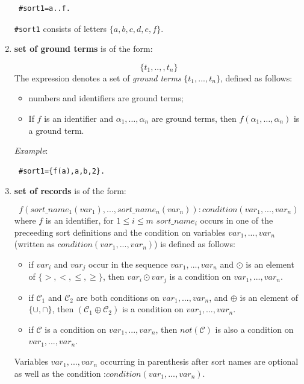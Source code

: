 \documentclass[12pt, letterpaper]{article}
\begin{document}
\begin{enumerate}
\begin{verbatim}
 #sort1=a..f.
\end{verbatim}

\texttt{\#sort1} consists of letters $\{a,b,c,d,e,f\}$.

\item \textbf{set of ground terms} is of the form:

\begin{equation*}
\{t_1,..,,t_n\}
\end{equation*}
The expression denotes a set of \textit{ground terms} $\{t_1,...,t_n\}$, defined as follows:
\begin{itemize}
 \item numbers and identifiers are ground terms;
 \item If $f$ is an identifier and $\alpha_1, \dots, \alpha_n$ are ground terms, 
then $f(\alpha_1,\dots, \alpha_n)$ is a ground term.
\end{itemize}

\textit{Example}: 
\begin{verbatim}
 #sort1={f(a),a,b,2}.
\end{verbatim}
\item \textbf{set of records} is of the form:

\begin{equation*}
f(sort\_name_1(var_1),..., sort\_name_n(var_n)):
                                     condition(var_1,...,var_n)
\end{equation*}
where $f$ is an identifier, for $ 1\leq i\leq m$ $sort\_name_i$ occurs in one of the preceeding sort definitions and  the condition on variables $var_1,...,var_n$ (written as $condition(var_1,...,var_n)$) is defined as follows:

\begin{itemize}
\item if $var_i$ and $var_j$ occur in the sequence  $var_1,...,var_n$ and $\odot$ is an element of $\{>,<,\le,\ge\}$, then $var_i \odot var_j$ is a condition on   $var_1,...,var_n$.
\item if $\mathcal{C}_1$ and $\mathcal{C}_2$ are both conditions on  $var_1,...,var_n$, and $\oplus$ is an element of  $\{\cup,\cap\}$, then
$(\mathcal{C}_1 \oplus \mathcal{C}_2)$ is a condition on  $var_1,...,var_n$.
\item if $\mathcal{C}$ is a  condition on  $var_1,...,var_n$, then $not(\mathcal{C})$ is also a condition on  $var_1,...,var_n$.
\end{itemize}
Variables $var_1,...,var_n$ occurring in parenthesis after sort names are optional as well as the condition :$condition(var_1,...,var_n)$.


\end{enumerate}
\end{document}
